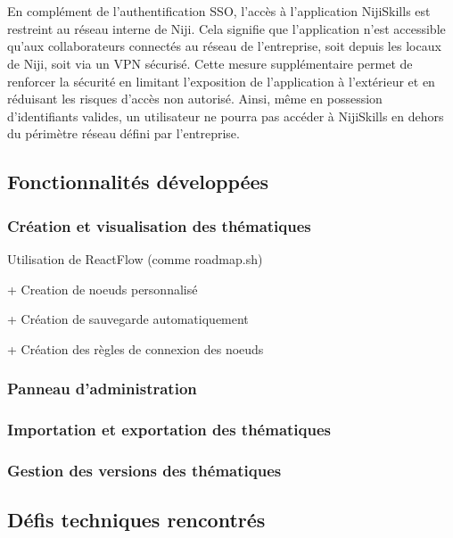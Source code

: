 \documentclass[12pt]{article}
\begin{document}
\\\\
En complément de l’authentification SSO, l’accès à l’application NijiSkills est restreint au réseau interne de Niji. Cela signifie que l’application n’est accessible qu’aux collaborateurs connectés au réseau de l’entreprise, soit depuis les locaux de Niji, soit via un VPN sécurisé. Cette mesure supplémentaire permet de renforcer la sécurité en limitant l’exposition de l’application à l’extérieur et en réduisant les risques d’accès non autorisé. Ainsi, même en possession d’identifiants valides, un utilisateur ne pourra pas accéder à NijiSkills en dehors du périmètre réseau défini par l’entreprise.
\subsection{Fonctionnalités développées}
\subsubsection{Création et visualisation des thématiques}

Utilisation de ReactFlow (comme roadmap.sh)

+ Creation de noeuds personnalisé

+ Création de sauvegarde automatiquement

+ Création des règles de connexion des noeuds
\subsubsection{Panneau d'administration}
\subsubsection{Importation et exportation des thématiques}
\subsubsection{Gestion des versions des thématiques}

\subsection{Défis techniques rencontrés}
\end{document}
